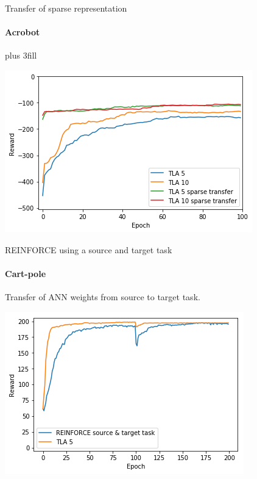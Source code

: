 \begin{frame}[fragile]{Transfer of sparse representation}
\framesubtitle{Acrobot}
\vskip0pt plus 3fill
\begin{center}
    \includegraphics[width=.8\linewidth]{results/Acrobot/sparse_transfer/reward_target_without_with.png}
\end{center}
\end{frame}

\begin{frame}[fragile]{REINFORCE using a source and target task}
\framesubtitle{Cart-pole}
Transfer of ANN weights from source to target task.
\begin{center}
    \includegraphics[width=.8\linewidth]{results/CartPole/reinforce_2tasks.png}
\end{center}
\end{frame}

